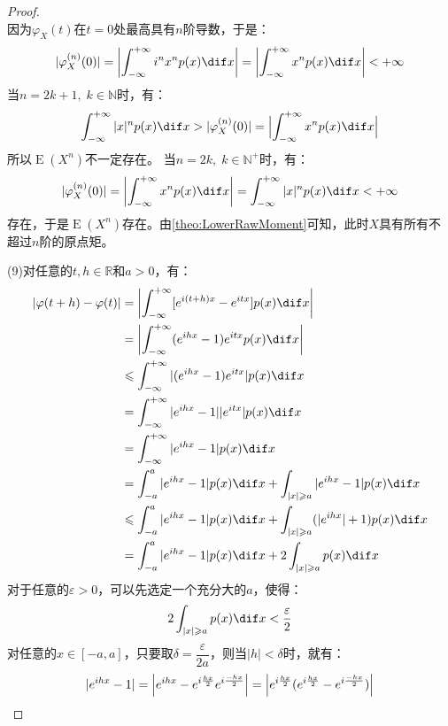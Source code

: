 \begin{proof}
\begin{equation*}
	\end{equation*}
	因为$\varphi_X(t)$在$t=0$处最高具有$n$阶导数，于是：
	\begin{equation*}
		|\varphi_X^{(n)}(0)|=\left|\int_{-\infty}^{+\infty}i^nx^np(x)\dif x\right|=\left|\int_{-\infty}^{+\infty}x^{n}p(x)\dif x\right|<+\infty
	\end{equation*}
	当$n=2k+1,\;k\in\mathbb{N}$时，有：
	\begin{equation*}
		\int_{-\infty}^{+\infty}|x|^{n}p(x)\dif x>|\varphi_X^{(n)}(0)|=\Bigl|\int_{-\infty}^{+\infty}x^np(x)\dif x\Bigr|
	\end{equation*}
	所以$\operatorname{E}(X^n)$不一定存在。
	当$n=2k,\;k\in\mathbb{N}^+$时，有：
	\begin{equation*}
		|\varphi_X^{(n)}(0)|=\left|\int_{-\infty}^{+\infty}x^{n}p(x)\dif x\right|=\int_{-\infty}^{+\infty}|x|^np(x)\dif x<+\infty
	\end{equation*}
	存在，于是$\operatorname{E}(X^n)$存在。由\cref{theo:LowerRawMoment}可知，此时$X$具有所有不超过$n$阶的原点矩。\par
	(9)对任意的$t,h\in \mathbb{R}$和$a>0$，有：
	\begin{align*}
		|\varphi(t+h)-\varphi(t)|
		&=\left|\int_{-\infty}^{+\infty}[e^{i(t+h)x}-e^{itx}]p(x)\dif x\right| \\
		&=\left|\int_{-\infty}^{+\infty}(e^{ihx}-1)e^{itx}p(x)\dif x\right| \\
		&\leqslant\int_{-\infty}^{+\infty}|(e^{ihx}-1)e^{itx}|p(x)\dif x \\
		&=\int_{-\infty}^{+\infty}|e^{ihx}-1||e^{itx}|p(x)\dif x \\
		&=\int_{-\infty}^{+\infty}|e^{ihx}-1|p(x)\dif x \\
		&=\int_{-a}^{a}|e^{ihx}-1|p(x)\dif x+\int_{|x|\geqslant a}|e^{ihx}-1|p(x)\dif x \\
		&\leqslant\int_{-a}^{a}|e^{ihx}-1|p(x)\dif x+\int_{|x|\geqslant a}(|e^{ihx}|+1)p(x)\dif x \\
		&=\int_{-a}^{a}|e^{ihx}-1|p(x)\dif x+2\int_{|x|\geqslant a}p(x)\dif x
	\end{align*}
	对于任意的$\varepsilon>0$，可以先选定一个充分大的$a$，使得：
	\begin{equation*}
		2\int_{|x|\geqslant a}p(x)\dif x<\frac{\varepsilon}{2}
	\end{equation*}
	对任意的$x\in[-a,a]$，只要取$\delta=\dfrac{\varepsilon}{2a}$，则当$|h|<\delta$时，就有：
	\begin{align*}
		|e^{ihx}-1|
		&=\Bigl|e^{ihx}-e^{i\frac{hx}{2}}e^{i\frac{-hx}{2}}\Bigr|=\Bigl|e^{i\frac{hx}{2}}(e^{i\frac{hx}{2}}-e^{i\frac{-hx}{2}})\Bigr| \\

\end{align*}
\end{proof}
